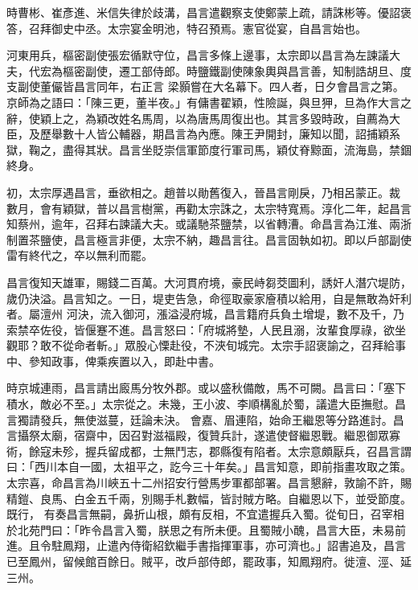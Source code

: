 \begin{pinyinscope}
 時曹彬、崔彥進、米信失律於歧溝，昌言遣觀察支使鄭蒙上疏，請誅彬等。優詔褒答，召拜御史中丞。太宗宴金明池，特召預焉。憲官從宴，自昌言始也。



 河東用兵，樞密副使張宏循默守位，昌言多條上邊事，太宗即以昌言為左諫議大夫，代宏為樞密副使，遷工部侍郎。時鹽鐵副使陳象輿與昌言善，知制誥胡旦、度支副使董儼皆昌言同年，右正言
 梁顥嘗在大名幕下。四人者，日夕會昌言之第。京師為之語曰：「陳三更，董半夜。」有傭書翟穎，性險誕，與旦狎，旦為作大言之辭，使穎上之，為穎改姓名馬周，以為唐馬周復出也。其言多毀時政，自薦為大臣，及歷舉數十人皆公輔器，期昌言為內應。陳王尹開封，廉知以聞，詔捕穎系獄，鞠之，盡得其狀。昌言坐貶崇信軍節度行軍司馬，穎仗脊黥面，流海島，禁錮終身。



 初，太宗厚遇昌言，垂欲相之。趙普以勛舊復入，晉昌言剛戾，乃相呂蒙正。裁
 數月，會有穎獄，普以昌言樹黨，再勸太宗誅之，太宗特寬焉。淳化二年，起昌言知蔡州，逾年，召拜右諫議大夫。或議馳茶鹽禁，以省轉漕。命昌言為江淮、兩浙制置茶鹽使，昌言極言非便，太宗不納，趣昌言往。昌言固執如初。即以戶部副使雷有終代之，卒以無利而罷。



 昌言復知天雄軍，賜錢二百萬。大河貫府境，豪民峙芻茭圖利，誘奸人潛穴堤防，歲仍決溢。昌言知之。一日，堤吏告急，命徑取豪家廥積以給用，自是無敢為奸利者。屬澶州
 河決，流入御河，漲溢浸府城，昌言籍府兵負土增堤，數不及千，乃索禁卒佐役，皆偃蹇不進。昌言怒曰：「府城將墊，人民且溺，汝輩食厚祿，欲坐觀耶？敢不從命者斬。」眾股心慄赴役，不浹旬城完。太宗手詔褒諭之，召拜給事中、參知政事，俾乘疾置以入，即赴中書。



 時京城連雨，昌言請出廄馬分牧外郡。或以盛秋備敵，馬不可闕。昌言曰：「塞下積水，敵必不至。」太宗從之。未幾，王小波、李順構亂於蜀，議遣大臣撫慰。昌言獨請發兵，無使滋蔓，廷論未決。
 會嘉、眉連陷，始命王繼恩等分路進討。昌言攝祭太廟，宿齋中，因召對滋福殿，復贊兵計，遂遣使督繼恩戰。繼恩御眾寡術，餘寇未殄，握兵留成都，士無鬥志，郡縣復有陷者。太宗意頗厭兵，召昌言謂曰：「西川本自一國，太祖平之，訖今三十年矣。」昌言知意，即前指畫攻取之策。太宗喜，命昌言為川峽五十二州招安行營馬步軍都部署。昌言懇辭，敦諭不許，賜精鎧、良馬、白金五千兩，別賜手札數幅，皆討賊方略。自繼恩以下，並受節度。既行，
 有奏昌言無嗣，鼻折山根，頗有反相，不宜遣握兵入蜀。從旬日，召宰相於北苑門曰：「昨令昌言入蜀，朕思之有所未便。且蜀賊小醜，昌言大臣，未易前進。且令駐鳳翔，止遣內侍衛紹欽繼手書指揮軍事，亦可濟也。」詔書追及，昌言已至鳳州，留候館百餘日。賊平，改戶部侍郎，罷政事，知鳳翔府。徙澶、涇、延三州。




\end{pinyinscope}
